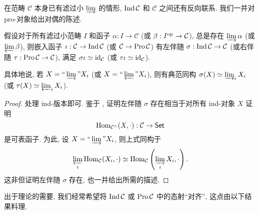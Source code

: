 在范畴 $\mathcal{C}$ 本身已有滤过小 $\varinjlim$ 的情形, $\operatorname{Ind}\mathcal{C}$ 和 $\mathcal{C}$ 之间还有反向联系. 我们一并对 pro-对象给出对偶的陈述.

\begin{proposition}\label{prop:Ind-adjunction}
	假设对于所有滤过小范畴 $I$ 和函子 $\alpha: I \to \mathcal{C}$ (或 $\beta: I^{\operatorname{op}} \to \mathcal{C}$), 总是存在 $\varinjlim \alpha$ (或 $\varprojlim \beta$), 则嵌入函子 $\iota: \mathcal{C} \to \operatorname{Ind}\mathcal{C}$ (或 $\mathcal{C} \to \operatorname{Pro}\mathcal{C}$) 有左伴随 $\sigma: \operatorname{Ind}\mathcal{C} \to \mathcal{C}$ (或右伴随 $\tau: \operatorname{Pro}\mathcal{C} \to \mathcal{C}$), 满足 $\sigma\iota \simeq \mathrm{id}_{\mathcal{C}}$ (或 $\tau\iota \simeq \mathrm{id}_{\mathcal{C}}$).
	
	具体地说, 若 $X = \Yinjlim X_i$ (或 $X = \Yprojlim X_i$), 则有典范同构 $\sigma(X) \simeq \varinjlim_i X_i$ (或 $\tau(X) \simeq \varprojlim_i X_i$). 
\end{proposition}
\begin{proof}
	处理 ind-版本即可. 鉴于 \cite[命题 2.6.9]{Li1}, 证明左伴随 $\sigma$ 存在相当于对所有 ind-对象 $X$ 证明
	\[ \operatorname{Hom}_{\mathcal{C}^\wedge}(X, \cdot): \mathcal{C} \to \mathsf{Set} \]
	是可表函子. 为此, 设 $X = \Yinjlim X_i$, 则上式同构于
	\[ \varprojlim_i \operatorname{Hom}_{\mathcal{C}}(X_i, \cdot) \simeq \operatorname{Hom}_{\mathcal{C}}\left( \varinjlim_i X_i, \cdot\right). \]
	这非但证明左伴随 $\sigma$ 存在, 也一并给出所需的描述.
\end{proof}

出于理论的需要, 我们经常希望将 $\operatorname{Ind}\mathcal{C}$ 或 $\operatorname{Pro}\mathcal{C}$ 中的态射``对齐'', 这点由以下结果料理.

